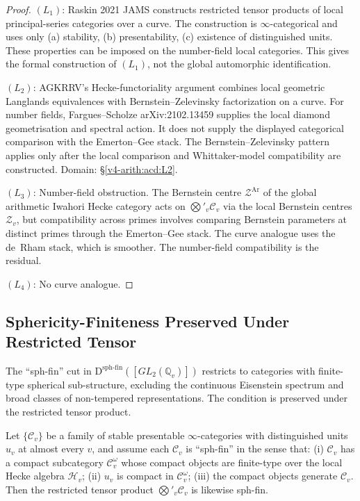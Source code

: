 \begin{proof}
\((L_{1})\): Raskin 2021 JAMS constructs restricted tensor products of
local principal-series categories over a curve. The construction is
\(\infty\)-categorical and uses only (a) stability, (b) presentability,
(c) existence of distinguished units. These properties can be imposed
on the number-field local categories. This gives the formal construction
of \((L_{1})\), not the global automorphic identification.

\((L_{2})\): AGKRRV's Hecke-functoriality argument combines local
geometric Langlands equivalences with Bernstein--Zelevinsky
factorization on a curve. For number fields,
Fargues--Scholze arXiv:2102.13459 supplies the local diamond
geometrisation and spectral action. It does not supply the displayed
categorical comparison with the Emerton--Gee stack. The
Bernstein--Zelevinsky pattern applies only after the local
comparison and Whittaker-model compatibility are constructed. Domain:
\S\ref{v4-arith:acd:L2}.

\((L_{3})\): Number-field obstruction. The Bernstein centre
\(\mathcal{Z}^{\mathrm{Ar}}\) of the global arithmetic Iwahori Hecke
category acts on \(\bigotimes'_{v}\mathcal{C}_{v}\) via the local
Bernstein centres \(\mathcal{Z}_{v}\), but compatibility across primes
involves comparing Bernstein parameters at distinct primes through
the Emerton--Gee stack. The curve analogue uses the de~Rham
stack, which is smoother. The number-field compatibility is the
residual.

\((L_{4})\): No curve analogue.
\end{proof}

\subsection{Sphericity-Finiteness Preserved Under Restricted Tensor}
\label{v4-arith:acd:obstruction-3}

The ``sph-fin'' cut in
\(\mathrm{D}^{\mathrm{sph\text{-}fin}}([GL_{2}(\mathbb{Q}_{v})])\)
restricts to categories with finite-type spherical sub-structure,
excluding the continuous Eisenstein spectrum and broad classes of
non-tempered representations. The condition is preserved under the
restricted tensor product.

\begin{lemma}
\label{v4-arith:acd:lem:sph-fin-preservation}
Let \(\{\mathcal{C}_{v}\}\) be a family of
stable presentable \(\infty\)-categories with distinguished units
\(u_{v}\) at almost every \(v\), and assume each \(\mathcal{C}_{v}\) is
``sph-fin'' in the sense that: (i) \(\mathcal{C}_{v}\) has a compact
subcategory \(\mathcal{C}_{v}^{\omega}\) whose compact objects are
finite-type over the local Hecke algebra \(\mathcal{H}_{v}\); (ii)
\(u_{v}\) is compact in \(\mathcal{C}_{v}^{\omega}\); (iii) the compact
objects generate \(\mathcal{C}_{v}\). Then the restricted tensor
product \(\bigotimes'_{v}\mathcal{C}_{v}\) is likewise sph-fin.
\end{lemma}

